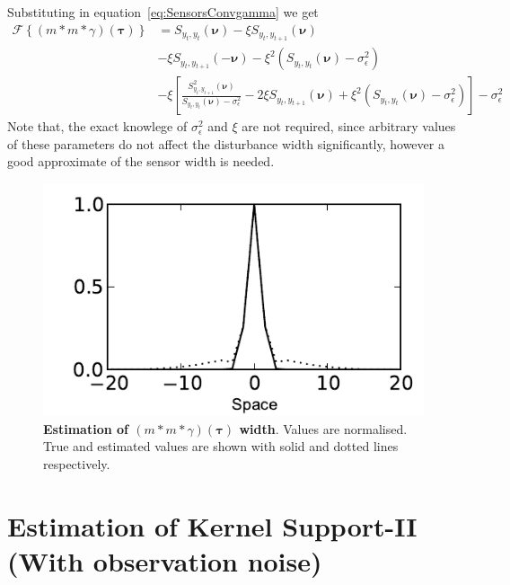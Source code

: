 \documentclass[]{article}
\begin{document}
Substituting in equation~\ref{eq:SensorsConvgamma} we get
\begin{align}
 \mathcal{F}\left\{\left(m\ast m\ast \gamma\right)\left(\boldsymbol\tau\right)\right\}&=S_{y_{t},y_{t}}\left(\boldsymbol\nu\right)-\xi S_{y_{t},y_{t+1}}\left(\boldsymbol\nu\right) \nonumber \\
&-\xi S_{y_{t},y_{t+1}}\left(-\boldsymbol\nu\right)-\xi^2 \left(S_{y_{t},y_{t}}\left(\boldsymbol\nu\right)-\sigma_{\epsilon}^2\right) \nonumber\\
&-\xi  \left[\frac{S_{y_{t},y_{t+1}}^2\left(\boldsymbol\nu\right)}{S_{y_{t},y_{t}}\left(\boldsymbol\nu\right)-\sigma_{\epsilon}^2}-2\xi S_{y_{t},y_{t+1}}\left(\boldsymbol\nu\right)+\xi^2\left(S_{y_{t},y_{t}}\left(\boldsymbol\nu\right)-\sigma_{\epsilon}^2\right)\right]-\sigma_{\epsilon}^2
\end{align}
Note that, the exact knowlege of $\sigma_{\epsilon}^2$ and $\xi$ are not required, since arbitrary values of these parameters do not affect the disturbance width significantly, however a good approximate of the sensor width is needed.
\begin{figure}[!ht]
\begin{center}
\includegraphics{./Figures/DisturbanceWidthEstimation.pdf}
\end{center}
\caption{{\bf Estimation of $\left(m\ast m \ast \gamma \right)\left(\boldsymbol \tau\right) $ width}. Values are normalised. True  and estimated values are shown with solid and dotted lines respectively.}
\label{fig:DisturbanceWidth}
\end{figure}
\newpage
\section*{Estimation of Kernel Support-II (With observation noise)}
\end{document}
